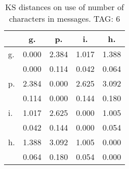\begin{table}[h!]
\begin{center}
\begin{tabular}{| l | c | c | c | c |}\hline
 & g. & p. & i. & h. \\\hline
g. & 0.000  & 2.384  & 1.017  & 1.388 \\\hline
 & 0.000  & 0.114  & 0.042  & 0.064 \\\hline
p. & 2.384  & 0.000  & 2.625  & 3.092 \\\hline
 & 0.114  & 0.000  & 0.144  & 0.180 \\\hline
i. & 1.017  & 2.625  & 0.000  & 1.005 \\\hline
 & 0.042  & 0.144  & 0.000  & 0.054 \\\hline
h. & 1.388  & 3.092  & 1.005  & 0.000 \\\hline
 & 0.064  & 0.180  & 0.054  & 0.000 \\\hline
\end{tabular}
\caption{KS distances on use of number of characters in messages. TAG: 6}
\end{center}
\end{table}